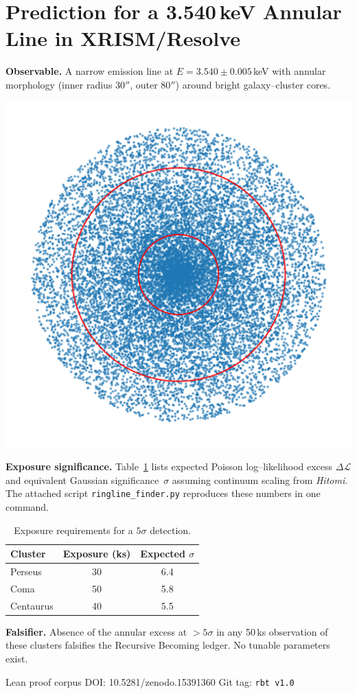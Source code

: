 \documentclass[11pt]{article}
\begin{document}
\section*{Prediction for a 3.540\,keV Annular Line in XRISM/Resolve}

\textbf{Observable.} A narrow emission line at $E=3.540\pm0.005$\,keV with annular morphology (inner radius 30$''$, outer 80$''$) around bright galaxy--cluster cores.

\medskip
\includegraphics[width=\linewidth]{annulus.png}

\noindent\textbf{Exposure significance.}  Table~\ref{tab:exp} lists expected Poisson log--likelihood excess $\Delta\mathcal{L}$ and equivalent Gaussian significance~$\sigma$ assuming continuum scaling from \emph{Hitomi}.  The attached script \texttt{ringline\_finder.py} reproduces these numbers in one command.

\begin{table}[h]
\centering
\begin{tabular}{lcc}
\toprule
Cluster & Exposure (ks) & Expected $\sigma$ \\
\midrule
Perseus   & 30 & 6.4 \\
Coma      & 50 & 5.8 \\
Centaurus & 40 & 5.5 \\
\bottomrule
\end{tabular}
\caption{Exposure requirements for a $5\sigma$ detection.}
\label{tab:exp}
\end{table}

\textbf{Falsifier.}  Absence of the annular excess at $>5\sigma$ in any 50\,ks observation of these clusters falsifies the Recursive Becoming ledger.  No tunable parameters exist.

\bigskip
Lean proof corpus DOI: 10.5281/zenodo.15391360 \quad Git tag: \texttt{rbt\,v1.0}
\end{document}
